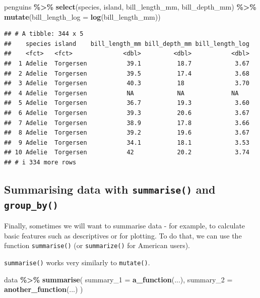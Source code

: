 \documentclass[
]{book}
\newenvironment{Shaded}{\begin{snugshade}}{\end{snugshade}}
\newcommand{\AttributeTok}[1]{\textcolor[rgb]{0.13,0.29,0.53}{#1}}
\newcommand{\FunctionTok}[1]{\textcolor[rgb]{0.13,0.29,0.53}{\textbf{#1}}}
\newcommand{\NormalTok}[1]{#1}
\newcommand{\SpecialCharTok}[1]{\textcolor[rgb]{0.81,0.36,0.00}{\textbf{#1}}}
\begin{document}
\begin{Shaded}
\begin{Highlighting}[]
\NormalTok{penguins }\SpecialCharTok{\%\textgreater{}\%}
  \FunctionTok{select}\NormalTok{(species, island, bill\_length\_mm, bill\_depth\_mm) }\SpecialCharTok{\%\textgreater{}\%}
  \FunctionTok{mutate}\NormalTok{(}\AttributeTok{bill\_length\_log =} \FunctionTok{log}\NormalTok{(bill\_length\_mm))}
\end{Highlighting}
\end{Shaded}

\begin{verbatim}
## # A tibble: 344 x 5
##    species island    bill_length_mm bill_depth_mm bill_length_log
##    <fct>   <fct>              <dbl>         <dbl>           <dbl>
##  1 Adelie  Torgersen           39.1          18.7            3.67
##  2 Adelie  Torgersen           39.5          17.4            3.68
##  3 Adelie  Torgersen           40.3          18              3.70
##  4 Adelie  Torgersen           NA            NA             NA   
##  5 Adelie  Torgersen           36.7          19.3            3.60
##  6 Adelie  Torgersen           39.3          20.6            3.67
##  7 Adelie  Torgersen           38.9          17.8            3.66
##  8 Adelie  Torgersen           39.2          19.6            3.67
##  9 Adelie  Torgersen           34.1          18.1            3.53
## 10 Adelie  Torgersen           42            20.2            3.74
## # i 334 more rows
\end{verbatim}

\hypertarget{summarising-data-with-summarise-and-group_by}{%
\subsection{\texorpdfstring{Summarising data with \texttt{summarise()} and \texttt{group\_by()}}{Summarising data with summarise() and group\_by()}}\label{summarising-data-with-summarise-and-group_by}}

Finally, sometimes we will want to summarise data - for example, to calculate basic features such as descriptives or for plotting. To do that, we can use the function \texttt{summarise()} (or \texttt{summarize()} for American users).

\texttt{summarise()} works very similarly to \texttt{mutate()}.

\begin{Shaded}
\begin{Highlighting}[]
\NormalTok{data }\SpecialCharTok{\%\textgreater{}\%}
  \FunctionTok{summarise}\NormalTok{(}
    \AttributeTok{summary\_1 =} \FunctionTok{a\_function}\NormalTok{(...),}
    \AttributeTok{summary\_2 =} \FunctionTok{another\_function}\NormalTok{(...)}
\NormalTok{    )}
\end{Highlighting}
\end{Shaded}
\end{document}
